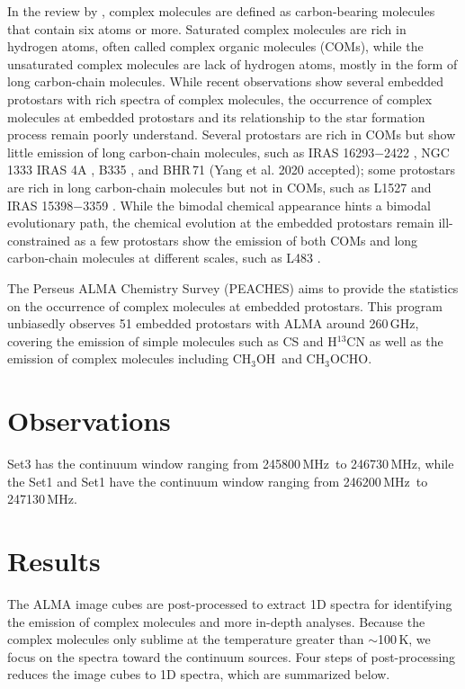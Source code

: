 \documentclass[twocolumn]{aastex62}
\newcommand{\mhz}{\mbox{\,MHz}}
\newcommand{\methylformate}{\mbox{CH$_{3}$OCHO}}
\newcommand{\methanol}{\mbox{CH$_{3}$OH}}
\begin{document}
In the review by \citet{2009ARA&A..47..427H}, complex molecules are defined as carbon-bearing molecules that contain six atoms or more.  Saturated complex molecules are rich in hydrogen atoms, often called complex organic molecules (COMs), while the unsaturated complex molecules are lack of hydrogen atoms, mostly in the form of long carbon-chain molecules.  While recent observations show several embedded protostars with rich spectra of complex molecules, the occurrence of complex molecules at embedded protostars and its relationship to the star formation process remain poorly understand.  Several protostars are rich in COMs but show little emission of long carbon-chain molecules, such as IRAS 16293$-$2422 \citep{2016A&A...595A.117J}, NGC 1333 IRAS 4A \citep{2004ApJ...615..354B}, B335 \citep{2016ApJ...830L..37I,2019ApJ...873L..21I}, and BHR\,71 (Yang et al. 2020 accepted); some protostars are rich in long carbon-chain molecules but not in COMs, such as L1527 \citep{2010ApJ...722.1633S} and IRAS 15398$-$3359 \citep{2009ApJ...697..769S}.  While the bimodal chemical appearance hints a bimodal evolutionary path, the chemical evolution at the embedded protostars remain ill-constrained as a few protostars show the emission of both COMs and long carbon-chain molecules at different scales, such as L483 \citep{2017ApJ...837..174O}. 

The Perseus ALMA Chemistry Survey (PEACHES) aims to provide the statistics on the occurrence of complex molecules at embedded protostars.  This program unbiasedly observes 51 embedded protostars with ALMA around 260\,GHz, covering the emission of simple molecules such as CS and H$^{13}$CN as well as the emission of complex molecules including \methanol\ and \methylformate.  

\section{Observations}
Set3 has the continuum window ranging from 245800\mhz\ to 246730\mhz, while the Set1 and Set1 have the continuum window ranging from 246200\mhz\ to 247130\mhz.





\section{Results}
The ALMA image cubes are post-processed to extract 1D spectra for identifying the emission of complex molecules and more in-depth analyses.  Because the complex molecules only sublime at the temperature greater than $\sim$100\,K, we focus on the spectra toward the continuum sources.  Four steps of post-processing reduces the image cubes to 1D spectra, which are summarized below.
\end{document}
